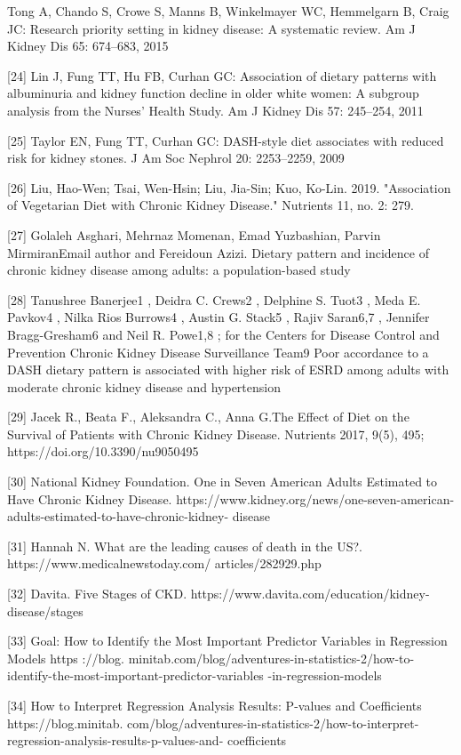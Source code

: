 \begin{flushleft}
[23]	 Tong A, Chando S, Crowe S, Manns B, Winkelmayer WC, Hemmelgarn B, Craig JC: Research 
priority setting in kidney disease: A systematic review. Am J Kidney Dis 65: 674–683, 2015

[24]	Lin J, Fung TT, Hu FB, Curhan GC: Association of dietary patterns with albuminuria and kidney
function decline in older white women: A subgroup analysis from the Nurses’ Health Study. Am J 
Kidney Dis 57: 245–254, 2011 

[25]	Taylor EN, Fung TT, Curhan GC: DASH-style diet associates with reduced risk for kidney stones.
J Am Soc Nephrol 20: 2253–2259, 2009 

[26]	Liu, Hao-Wen; Tsai, Wen-Hsin; Liu, Jia-Sin; Kuo, Ko-Lin. 2019. "Association of Vegetarian Diet with Chronic Kidney Disease." Nutrients 11, no. 2: 279.

[27]	Golaleh Asghari, Mehrnaz Momenan, Emad Yuzbashian, Parvin MirmiranEmail author and Fereidoun Azizi. Dietary pattern and incidence of chronic kidney disease among adults: a population-based study

[28]	Tanushree Banerjee1 , Deidra C. Crews2 , Delphine S. Tuot3 , Meda E. Pavkov4 , Nilka Rios Burrows4 , Austin G. Stack5 , Rajiv Saran6,7 , Jennifer Bragg-Gresham6 and Neil R. Powe1,8 ; for the Centers for Disease Control and Prevention Chronic Kidney Disease Surveillance Team9 Poor accordance to a DASH dietary pattern is associated with higher risk of ESRD among adults with moderate chronic kidney disease and hypertension

[29]	 Jacek R., Beata F., Aleksandra C., Anna G.The Effect of Diet on the Survival of Patients with Chronic Kidney Disease. Nutrients 2017, 9(5), 495; https://doi.org/10.3390/nu9050495

[30] National Kidney Foundation. One in Seven American Adults Estimated to Have Chronic Kidney 
Disease. https://www.kidney.org/news/one-seven-american-adults-estimated-to-have-chronic-kidney-
disease

[31]	Hannah N. What are the leading causes of death in the US?. https://www.medicalnewstoday.com/
articles/282929.php 

[32]	Davita. Five Stages of CKD. https://www.davita.com/education/kidney-disease/stages

[33]	Goal: How to Identify the Most Important Predictor Variables in Regression Models https 
://blog. minitab.com/blog/adventures-in-statistics-2/how-to-identify-the-most-important-predictor-variables
-in-regression-models

[34]	How to Interpret Regression Analysis Results: P-values and Coefficients https://blog.minitab.
com/blog/adventures-in-statistics-2/how-to-interpret-regression-analysis-results-p-values-and-
coefficients


\end{flushleft}
